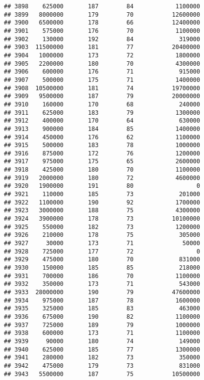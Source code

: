 \documentclass[
]{article}
\begin{document}
\begin{verbatim}
## 3898    625000       187        84            1100000
## 3899   8000000       179        70           12600000
## 3900   6500000       178        66           12400000
## 3901    575000       176        70            1100000
## 3902    130000       192        84             319000
## 3903  11500000       181        77           20400000
## 3904   1000000       173        72            1800000
## 3905   2200000       180        70            4300000
## 3906    600000       176        71             915000
## 3907    500000       175        71            1400000
## 3908  10500000       181        74           19700000
## 3909   9500000       187        79           20000000
## 3910    160000       170        68             240000
## 3911    625000       183        79            1300000
## 3912    400000       170        64             630000
## 3913    900000       184        85            1400000
## 3914    450000       176        62            1100000
## 3915    500000       183        78            1000000
## 3916    875000       172        76            1200000
## 3917    975000       175        65            2600000
## 3918    425000       180        70            1100000
## 3919   2000000       180        72            4600000
## 3920   1900000       191        80                  0
## 3921    110000       185        73             201000
## 3922   1100000       190        92            1700000
## 3923   3000000       188        75            4300000
## 3924   3900000       178        73           10100000
## 3925    550000       182        73            1200000
## 3926    210000       178        75             305000
## 3927     30000       173        71              50000
## 3928    725000       177        72                  0
## 3929    475000       180        70             831000
## 3930    150000       185        85             218000
## 3931    700000       186        70            1100000
## 3932    350000       173        71             543000
## 3933  28000000       190        79           47600000
## 3934    975000       187        78            1600000
## 3935    325000       185        83             463000
## 3936    675000       190        82            1100000
## 3937    725000       189        79            1000000
## 3938    600000       173        71            1100000
## 3939     90000       180        74             149000
## 3940    625000       185        77            1300000
## 3941    280000       182        73             350000
## 3942    475000       179        73             831000
## 3943   5500000       187        75           10500000

\end{verbatim}
\end{document}
